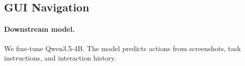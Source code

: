 

\subsection{GUI Navigation}
\label{app:gui_downstream}

\paragraph{Downstream model.}
We fine-tune Qwen3.5-4B. The model predicts actions from screenshots, task instructions, and interaction history.

